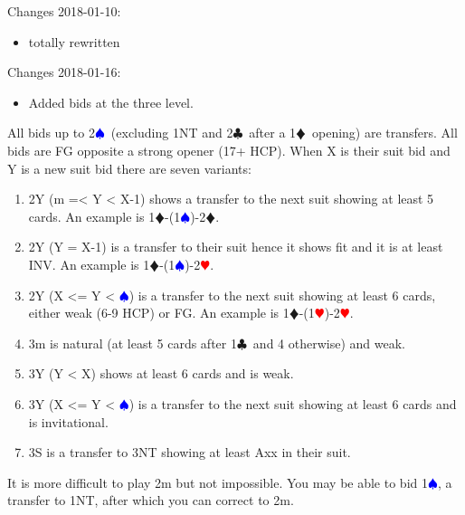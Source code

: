\documentclass[a4paper]{article}
\newcommand{\BC}{\textcolor{OliveGreen}{$\clubsuit$}}
\newcommand{\BD}{\textcolor{RedOrange}{$\vardiamondsuit$}}
\newcommand{\BH}{\textcolor{Red}{$\varheartsuit${}}}
\newcommand{\BS}{\textcolor{Blue}{$\spadesuit${}}}
\begin{document}
Changes 2018-01-10:
\bigbreak
\begin{itemize}
\item totally rewritten

\end{itemize}
\bigbreak
Changes 2018-01-16:
\bigbreak
\begin{itemize}
\item Added bids at the three level.

\end{itemize}
\bigbreak
All bids up to 2\BS\ (excluding 1NT and 2\BC\ after a 1\BD\ opening) are
transfers. All bids are FG opposite a strong opener (17+ HCP).
\bigbreak
When X is their suit bid and Y is a new suit bid there are seven variants:
\bigbreak
\begin{enumerate}
\item 2Y (m =< Y < X-1) shows a transfer to the next suit showing at least 5 cards. An example is 1\BD -(1\BS )-2\BD .

\item 2Y (Y = X-1) is a transfer to their suit hence it shows fit and it is at least INV. An example is 1\BD -(1\BS )-2\BH .

\item 2Y (X <= Y < \BS ) is a transfer to the next suit showing at least 6 cards,
   either weak (6-9 HCP) or FG. An example is 1\BD -(1\BH )-2\BH .

\item 3m is natural (at least 5 cards after 1\BC\ and 4 otherwise) and weak.

\item 3Y (Y < X) shows at least 6 cards and is weak.

\item 3Y (X <= Y < \BS ) is a transfer to the next suit showing at least 6 cards
   and is invitational.

\item 3S is a transfer to 3NT showing at least Axx in their suit.

\end{enumerate}
\bigbreak
It is more difficult to play 2m but not impossible. You may be able to bid
1\BS , a transfer to 1NT, after which you can correct to 2m.
\bigbreak
\
\end{document}
